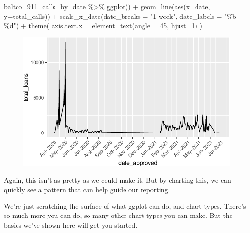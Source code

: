 \documentclass[
  letterpaper,
  DIV=11,
  numbers=noendperiod]{scrreprt}
\newenvironment{Shaded}{\begin{snugshade}}{\end{snugshade}}
\newcommand{\AttributeTok}[1]{\textcolor[rgb]{0.40,0.45,0.13}{#1}}
\newcommand{\DecValTok}[1]{\textcolor[rgb]{0.68,0.00,0.00}{#1}}
\newcommand{\FunctionTok}[1]{\textcolor[rgb]{0.28,0.35,0.67}{#1}}
\newcommand{\NormalTok}[1]{\textcolor[rgb]{0.00,0.23,0.31}{#1}}
\newcommand{\SpecialCharTok}[1]{\textcolor[rgb]{0.37,0.37,0.37}{#1}}
\newcommand{\StringTok}[1]{\textcolor[rgb]{0.13,0.47,0.30}{#1}}
\begin{document}
\begin{Shaded}
\begin{Highlighting}[]
\NormalTok{baltco\_911\_calls\_by\_date }\SpecialCharTok{\%\textgreater{}\%}
  \FunctionTok{ggplot}\NormalTok{() }\SpecialCharTok{+} 
  \FunctionTok{geom\_line}\NormalTok{(}\FunctionTok{aes}\NormalTok{(}\AttributeTok{x=}\NormalTok{date, }\AttributeTok{y=}\NormalTok{total\_calls)) }\SpecialCharTok{+} 
  \FunctionTok{scale\_x\_date}\NormalTok{(}\AttributeTok{date\_breaks =} \StringTok{"1 week"}\NormalTok{, }\AttributeTok{date\_labels =} \StringTok{"\%b \%d"}\NormalTok{) }\SpecialCharTok{+}
  \FunctionTok{theme}\NormalTok{(}
    \AttributeTok{axis.text.x =} \FunctionTok{element\_text}\NormalTok{(}\AttributeTok{angle =} \DecValTok{45}\NormalTok{,  }\AttributeTok{hjust=}\DecValTok{1}\NormalTok{)}
\NormalTok{  )}
\end{Highlighting}
\end{Shaded}

\begin{figure}[H]

{\centering \includegraphics{./visualizing-for-reporting_files/figure-pdf/unnamed-chunk-15-1.pdf}

}

\end{figure}

Again, this isn't as pretty as we could make it. But by charting this,
we can quickly see a pattern that can help guide our reporting.

We're just scratching the surface of what ggplot can do, and chart
types. There's so much more you can do, so many other chart types you
can make. But the basics we've shown here will get you started.

\end{document}
